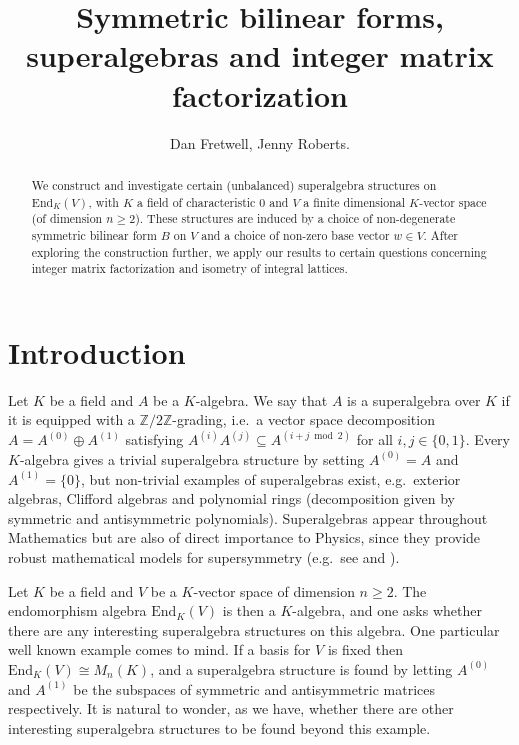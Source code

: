 \documentclass{amsart}
\title{Symmetric bilinear forms, superalgebras and integer matrix factorization}
\author{Dan Fretwell, Jenny Roberts.}
\date{}
\theoremstyle{plain}
\theoremstyle{definition}
\begin{document}
\begin{abstract}
   We construct and investigate certain (unbalanced) superalgebra structures on $\text{End}_K(V)$, with $K$ a field of characteristic $0$ and $V$ a finite dimensional $K$-vector space (of dimension $n\geq 2$). These structures are induced by a choice of non-degenerate symmetric bilinear form $B$ on $V$ and a choice of non-zero base vector $w\in V$. After exploring the construction further, we apply our results to certain questions concerning integer matrix factorization and isometry of integral lattices.
\end{abstract}

\maketitle

\section{Introduction}

Let $K$ be a field and $A$ be a $K$-algebra. We say that $A$ is a superalgebra over $K$ if it is equipped with a $\mathbb{Z}/2\mathbb{Z}$-grading, i.e.\ a vector space decomposition $A = A^{(0)}\oplus A^{(1)}$ satisfying $A^{(i)}A^{(j)} \subseteq A^{(i+j \bmod 2)}$ for all $i,j\in\{0,1\}$. Every $K$-algebra gives a trivial superalgebra structure by setting $A^{(0)} = A$ and $A^{(1)} = \{0\}$, but non-trivial examples of superalgebras exist, e.g.\ exterior algebras, Clifford algebras and polynomial rings (decomposition given by symmetric and antisymmetric polynomials). Superalgebras appear throughout Mathematics but are also of direct importance to Physics, since they provide robust mathematical models for supersymmetry (e.g.\ see \cite{deligne} and \cite{varadarajan}).

Let $K$ be a field and $V$ be a $K$-vector space of dimension $n\geq 2$. The endomorphism algebra $\text{End}_K(V)$ is then a $K$-algebra, and one asks whether there are any interesting superalgebra structures on this algebra. One particular well known example comes to mind. If a basis for $V$ is fixed then $\text{End}_K(V)\cong M_n(K)$, and a superalgebra structure is found by letting $A^{(0)}$ and 
$A^{(1)}$ be the subspaces of symmetric and antisymmetric matrices respectively. It is natural to wonder, as we have, whether there are other interesting superalgebra structures to be found beyond this example.
\end{document}
